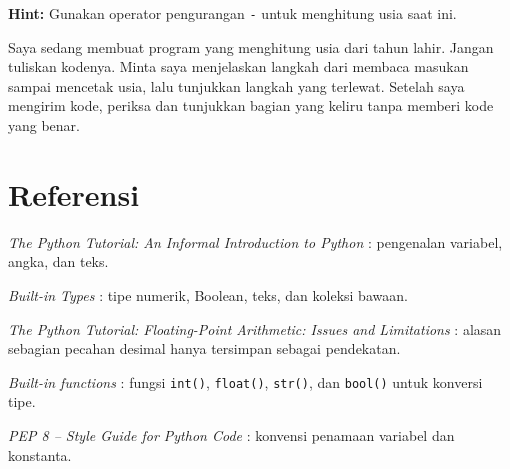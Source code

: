 \begin{enumerate}
\textbf{Hint:} Gunakan operator pengurangan \texttt{-} untuk menghitung usia saat ini.

  \begin{promptterarah}
  Saya sedang membuat program yang menghitung usia dari tahun lahir. Jangan tuliskan kodenya. Minta saya menjelaskan langkah dari membaca masukan sampai mencetak usia, lalu tunjukkan langkah yang terlewat. Setelah saya mengirim kode, periksa dan tunjukkan bagian yang keliru tanpa memberi kode yang benar.
  \end{promptterarah}
\end{enumerate}

\section*{Referensi}
\begin{daftarrapat}
  \item \textit{The Python Tutorial: An Informal Introduction to Python} \cite{py-tut-intro}: pengenalan variabel, angka, dan teks.
  \item \textit{Built-in Types} \cite{py-stdtypes}: tipe numerik, Boolean, teks, dan koleksi bawaan.
  \item \textit{The Python Tutorial: Floating-Point Arithmetic: Issues and Limitations} \cite{py-tut-floatingpoint}: alasan sebagian pecahan desimal hanya tersimpan sebagai pendekatan.
  \item \textit{Built-in functions} \cite{py-functions}: fungsi \texttt{int()}, \texttt{float()}, \texttt{str()}, dan \texttt{bool()} untuk konversi tipe.
  \item \textit{PEP 8 – Style Guide for Python Code} \cite{pep8}: konvensi penamaan variabel dan konstanta.
\end{daftarrapat}
